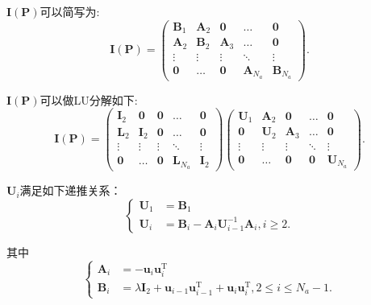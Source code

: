 \documentclass[notheorems,xetex]{beamer}
\theoremstyle{definition}
\begin{document}
\begin{frame}[noframenumbering]
$\bm{I}(\bm{P})$可以简写为:
\begin{equation*}
\bm{I}(\bm{P})=\begin{pmatrix}
                 \bm{B}_1 & \bm{A}_2 & \bm{0} & \dots & \bm{0} \\
                 \bm{A}_2 & \bm{B}_2 & \bm{A}_3 & \dots & \bm{0} \\
                 \vdots & \vdots & \vdots & \ddots & \vdots \\
                 \bm{0} & \dots & \bm{0} & \bm{A}_{N_a} & \bm{B}_{N_a}
               \end{pmatrix}.
\end{equation*}

$\bm{I}(\bm{P})$可以做LU分解如下:
\pause
\begin{equation*}\label{eq:LU}
  \bm{I}(\bm{P})=\begin{pmatrix}
                 \bm{I}_2 & \bm{0} & \bm{0} & \dots & \bm{0} \\
                 \bm{L}_2 & \bm{I}_2 & \bm{0} & \dots & \bm{0} \\
                 \vdots & \vdots & \vdots & \ddots & \vdots \\
                 \bm{0} & \dots & \bm{0} & \bm{L}_{N_a} & \bm{I}_{2}
               \end{pmatrix}\begin{pmatrix}
                 \bm{U}_1 & \bm{A}_2 & \bm{0} & \dots & \bm{0} \\
                 \bm{0} & \bm{U}_2 & \bm{A}_3 & \dots & \bm{0} \\
                 \vdots & \vdots & \vdots & \ddots & \vdots \\
                 \bm{0} & \dots & \bm{0} & \bm{0} & \bm{U}_{N_a}
               \end{pmatrix}.
\end{equation*}
\end{frame}
\begin{frame}[noframenumbering]
$\bm{U}_i$满足如下递推关系：
\begin{equation*}
\begin{cases}
  \bm{U}_1 &= \bm{B}_1 \\
  \bm{U}_i &= \bm{B}_i-\bm{A}_i\bm{U}_{i-1}^{-1}\bm{A}_i,i\geq 2.
\end{cases}
\end{equation*}

其中
\begin{equation*}
\begin{cases}
  \bm{A}_i &= -\bm{u}_i\bm{u}_i^{\textrm{T}} \\
  \bm{B}_i &=\lambda\bm{I}_2+\bm{u}_{i-1}\bm{u}_{i-1}^{\textrm{T}}+\bm{u}_i\bm{u}_i^{\textrm{T}}, 2 \leq i \leq N_a-1.
\end{cases}
\end{equation*}
\end{frame}
\end{document}
